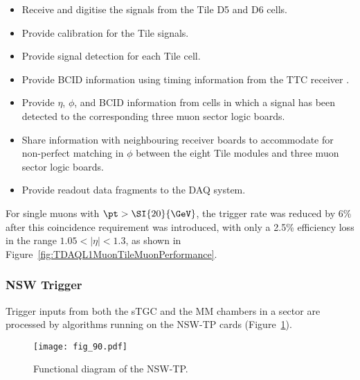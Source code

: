 \documentclass[cernpreprint, atlasdraft=false, UKenglish,british,orcidlogo, texmf, orcidlogo]{atlasdoc}
\begin{document}
\begin{itemize}
\item Receive and digitise the \analog signals from the Tile D5 and D6 cells.
\item Provide calibration for the Tile signals.
\item Provide signal detection for each Tile cell.
\item Provide \gls{BCID} information using timing information from the \gls{TTC} receiver \cite{bib:ttc}.
\item Provide $\eta$, $\phi$, and \gls{BCID} information from cells in which a signal has been detected to the corresponding three muon sector logic boards.
\item Share information with neighbouring receiver boards to accommodate for non-perfect matching in $\phi$ between the eight Tile modules and three muon sector logic boards.
\item Provide readout data fragments to the \gls{DAQ} system.
\end{itemize}
 
 
For single muons with $\pt > \SI{20}{\GeV}$, the trigger rate was reduced by 6\% after this coincidence requirement was introduced, with only a 2.5\% efficiency loss in the range $1.05 < |\eta| < 1.3$, as shown in Figure~\ref{fig:TDAQL1MuonTileMuonPerformance}.
 
\subsubsection{NSW Trigger\label{sec:NSWTP}}
 

 
Trigger inputs from both the \gls{sTGC} and the \gls{MM} chambers in a sector are processed by algorithms running on the \gls{NSW-TP} cards (Figure~\ref{fig:TdaqNswTp}).
\begin{figure}[ht]
\centering
\texttt{[image: fig\_90.pdf]}
\caption{Functional diagram of the \gls{NSW-TP}.}
\label{fig:TdaqNswTp}
\end{figure}
 
\end{document}
